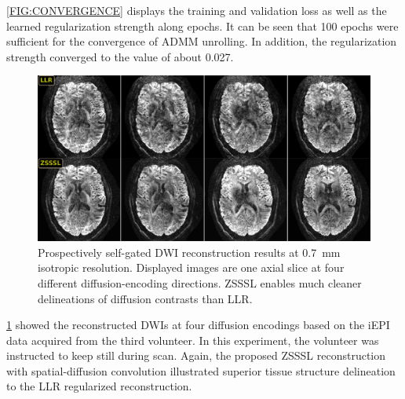 \documentclass[journal,twoside,web]{ieeecolor}
\begin{document}
	\cref{FIG:CONVERGENCE} displays the training and validation loss
	as well as the learned regularization strength along epochs.
	It can be seen that 100 epochs were sufficient for
	the convergence of ADMM unrolling.
	In addition, the regularization strength converged 
	to the value of about 0.027.


	\begin{figure}
		\includegraphics[width=\textwidth]{../figures/fig6.png}
		\caption{Prospectively self-gated DWI reconstruction results 
			at 0.7~mm isotropic resolution. Displayed images are 
			one axial slice at four different diffusion-encoding directions.
			ZSSSL enables much cleaner delineations of diffusion contrasts 
			than LLR.}
		\label{FIG:SG_ZSSSL_VOL3}
	\end{figure}
	
	\cref{FIG:SG_ZSSSL_VOL3} showed the reconstructed DWIs 
	at four diffusion encodings based on the iEPI data 
	acquired from the third volunteer. 
	In this experiment, the volunteer was instructed 
	to keep still during scan.
	Again, the proposed ZSSSL reconstruction 
	with spatial-diffusion convolution illustrated 
	superior tissue structure delineation 
	to the LLR regularized reconstruction.
\end{document}
